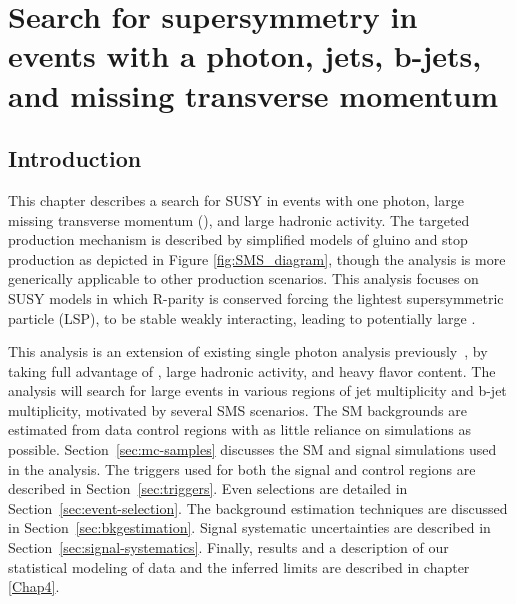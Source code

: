 \chapter[SUSY search with photon]{Search for supersymmetry in events with a photon, jets, b-jets, and missing transverse momentum}
\label{Chap3}
\section{Introduction}
This chapter describes a search for SUSY in events with one photon, large missing transverse momentum (\ptmiss), 
and large hadronic activity.  The targeted production mechanism is described by simplified models of gluino and stop
production as depicted in Figure \ref{fig:SMS_diagram}, though the analysis is 
more generically applicable to other production scenarios.  This analysis
focuses on SUSY models in which R-parity is conserved forcing the lightest supersymmetric particle (LSP), to 
be stable weakly interacting, leading to potentially large \ptmiss.  


This analysis is an extension of existing single photon analysis previously~\cite{Sirunyan:2017yse}, by taking full advantage
of \ptmiss, large hadronic activity, and heavy flavor content.  The analysis will search for large \ptmiss events
in various regions of jet multiplicity and b-jet multiplicity, motivated by several SMS scenarios.  The 
SM backgrounds are estimated from data control regions with as little reliance on simulations as possible.
Section~\ref{sec:mc-samples} discusses the SM and signal simulations used in the analysis.
The triggers used for both the signal and control regions are described in Section~\ref{sec:triggers}.   
Even selections are detailed in Section~\ref{sec:event-selection}. The background 
estimation techniques are discussed in Section~\ref{sec:bkgestimation}.  Signal systematic uncertainties are described in Section~\ref{sec:signal-systematics}.
Finally, results and a description of our statistical modeling of data and the inferred limits are described 
in chapter \ref{Chap4}.

